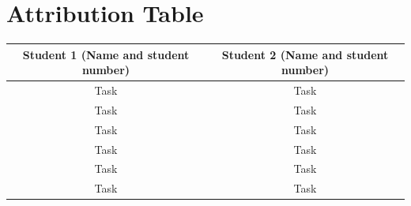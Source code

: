 \documentclass{article}
\begin{document}
\section{Attribution Table}

\begin{center}
\begin{tabular}{|| c | c ||}
\hline
 Student 1 (Name and student number) &  Student 2 (Name and student number) \\ 
 \hline
 Task & Task\\
 \hline
 Task & Task\\
 \hline
 Task & Task\\ 
 \hline
 Task & Task\\ 
 \hline
 Task & Task\\
 \hline
 Task & Task\\  
 \hline
\end{tabular}
\end{center}

\end{document}
